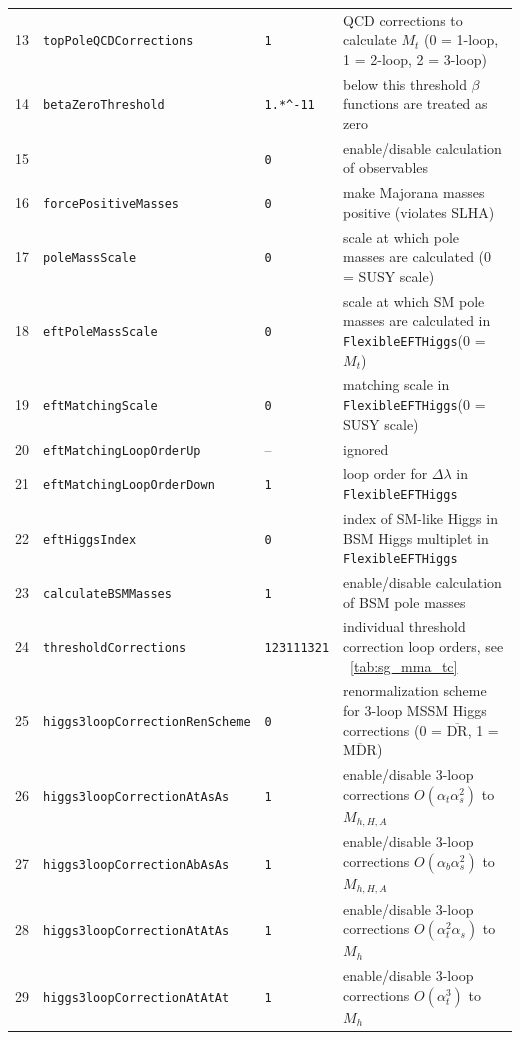 \documentclass[final,3p,11pt,pdflatex]{elsarticle}
\makeatletter
\newcommand{\feft}{\texttt{Flex\-ib\-le\-EFT\-Higgs}\@\xspace}
\newcommand{\code}[1]{\lstinline|#1|}  %
\newcommand{\ol}[1]{\overline{#1}}
\newcommand{\DRbar}{\ensuremath{\ol{\text{DR}}}\xspace}
\newcommand{\MDRbar}{\ensuremath{\ol{\text{MDR}}}\xspace}
\newcommand{\tabref}[1]{\tablename~\ref{#1}}
\def\at{\alpha_t}
\def\ab{\alpha_b}
\def\as{\alpha_s}
\makeatother
\begin{document}
\begin{table}
{\begin{tabularx}{1.2\textwidth}{lllX}
    13 & \code{topPoleQCDCorrections}         & \code{1} &
    QCD corrections to calculate $M_t$ (0 = 1-loop, 1 = 2-loop, 2 = 3-loop)\\
    14 & \code{betaZeroThreshold}             & \code{1.*^-11} &
    below this threshold $\beta$ functions are treated as zero\\
    15 & & \code{0} & enable/disable calculation of observables\\
    16 & \code{forcePositiveMasses}           & \code{0} &
    make Majorana masses positive (violates SLHA)\\
    17 & \code{poleMassScale}                 & \code{0} &
    scale at which pole masses are calculated (0 = SUSY scale)\\
    18 & \code{eftPoleMassScale}              & \code{0} &
    scale at which SM pole masses are calculated in \feft (0 = $M_t$)\\
    19 & \code{eftMatchingScale}              & \code{0} &
    matching scale in \feft (0 = SUSY scale)\\
    20 & \code{eftMatchingLoopOrderUp}        & -- &
    ignored\\
    21 & \code{eftMatchingLoopOrderDown}      & \code{1} &
    loop order for $\Delta\lambda$ in \feft\\
    22 & \code{eftHiggsIndex}                 & \code{0} &
    index of SM-like Higgs in BSM Higgs multiplet in \feft\\
    23 & \code{calculateBSMMasses}            & \code{1} &
    enable/disable calculation of BSM pole masses\\
    24 & \code{thresholdCorrections}          & \code{123111321} &
    individual threshold correction loop orders, see \tabref{tab:sg_mma_tc}\\
    25 & \code{higgs3loopCorrectionRenScheme} & \code{0} &
    renormalization scheme for 3-loop MSSM Higgs corrections
    (0 = \DRbar, 1 = \MDRbar)\\
    26 & \code{higgs3loopCorrectionAtAsAs}    & \code{1} &
    enable/disable 3-loop corrections $O(\at\as^2)$ to $M_{h,H,A}$\\
    27 & \code{higgs3loopCorrectionAbAsAs}    & \code{1} &
    enable/disable 3-loop corrections $O(\ab\as^2)$ to $M_{h,H,A}$\\
    28 & \code{higgs3loopCorrectionAtAtAs}    & \code{1} &
    enable/disable 3-loop corrections $O(\at^2\as)$ to $M_{h}$\\
    29 & \code{higgs3loopCorrectionAtAtAt}    & \code{1} &
    enable/disable 3-loop corrections $O(\at^3)$ to $M_{h}$\\

\end{tabularx}}
\end{table}
\end{document}
